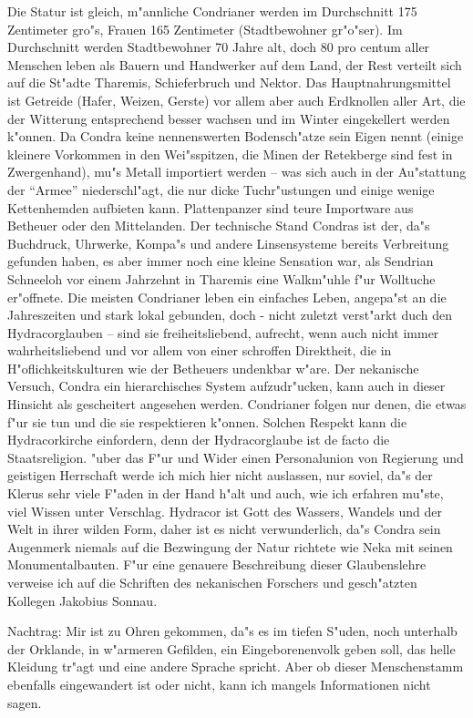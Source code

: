 \documentclass[a5paper,8pt]{book}
\begin{document}
Die Statur ist gleich, m"annliche Condrianer werden im Durchschnitt 175 Zentimeter gro"s, Frauen 165 Zentimeter (Stadtbewohner gr"o"ser). Im Durchschnitt werden Stadtbewohner 70 Jahre alt, doch 80 pro centum aller Menschen leben als Bauern und Handwerker auf dem Land, der Rest verteilt sich auf die St"adte Tharemis, Schieferbruch und Nektor. Das Hauptnahrungsmittel ist Getreide (Hafer, Weizen, Gerste) vor allem aber auch Erdknollen aller Art, die der Witterung entsprechend besser wachsen und im Winter eingekellert werden k"onnen. Da Condra keine nennenswerten Bodensch"atze sein Eigen nennt (einige kleinere Vorkommen in den Wei"sspitzen, die Minen der Retekberge sind fest in Zwergenhand), mu"s Metall importiert werden – was sich auch in der Au"stattung der “Armee” niederschl"agt, die nur dicke Tuchr"ustungen und einige wenige Kettenhemden aufbieten kann. Plattenpanzer sind teure Importware aus Betheuer oder den Mittelanden. Der technische Stand Condras ist der, da"s Buchdruck, Uhrwerke, Kompa"s und andere 
Linsensysteme bereits Verbreitung gefunden haben, es aber  immer noch eine kleine Sensation war, als Sendrian Schneeloh vor einem Jahrzehnt in Tharemis eine Walkm"uhle f"ur Wolltuche er"offnete. Die meisten Condrianer leben ein einfaches Leben, angepa"st an die Jahreszeiten und stark lokal gebunden, doch - nicht zuletzt verst"arkt duch den Hydracorglauben – sind sie freiheitsliebend, aufrecht, wenn auch nicht immer wahrheitsliebend und vor allem von einer schroffen Direktheit, die in H"oflichkeitskulturen wie der Betheuers undenkbar w"are.
Der nekanische Versuch, Condra ein hierarchisches System aufzudr"ucken, kann auch in dieser Hinsicht als gescheitert angesehen werden. Condrianer folgen nur denen, die etwas f"ur sie tun und die sie respektieren k"onnen. Solchen Respekt kann die Hydracorkirche einfordern, denn der Hydracorglaube ist de facto die Staatsreligion. "uber das F"ur und Wider einen Personalunion von Regierung und geistigen Herrschaft werde ich mich hier nicht auslassen, nur soviel, da"s der Klerus sehr viele F"aden in der Hand h"alt und auch, wie ich erfahren mu"ste, viel Wissen unter Verschlag. 
Hydracor ist Gott des Wassers, Wandels und der Welt in ihrer wilden Form, daher ist es nicht verwunderlich, da"s Condra sein Augenmerk niemals auf die Bezwingung der Natur richtete wie Neka mit seinen Monumentalbauten. F"ur eine genauere Beschreibung dieser Glaubenslehre verweise ich auf die Schriften des nekanischen Forschers und gesch"atzten Kollegen Jakobius Sonnau. 

Nachtrag: Mir ist zu Ohren gekommen, da"s es im tiefen S"uden, noch unterhalb der Orklande, in w"armeren Gefilden, ein Eingeborenenvolk geben soll, das helle Kleidung tr"agt und eine andere Sprache spricht. Aber ob dieser Menschenstamm ebenfalls eingewandert ist oder nicht, kann ich mangels Informationen nicht sagen. 
\end{document}
